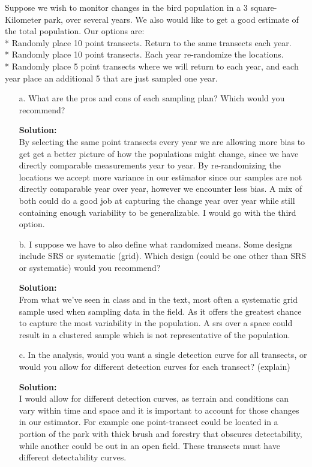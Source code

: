 \documentclass[12pt]{article}
\makeatletter
\theoremstyle{homework}
\newenvironment{exercise}[1]
{\def\@currentlabel{#1}\exercisecore}
{\endexercisecore}
\newcommand{\localhead}[1]{\par\smallskip\noindent\textbf{#1}\nobreak\\}%
\newcommand\solution{\localhead{Solution:}}
\makeatother
\begin{document}
\begin{exercise}{6} Suppose we wish to monitor changes in the bird population in a 3 square-Kilometer park, over several years. 
  We also would like to get a good estimate of the total population. Our options are:\\
  * Randomly place 10 point transects. Return to the same transects each year.\\
  * Randomly place 10 point transects. Each year re-randomize the locations.\\
  * Randomly place 5 point transects where we will return to each year, and each year place an additional 5 that are just sampled one year.\\
  \begin{enumerate}
    \item[a.] What are the pros and cons of each sampling plan? Which would you recommend?\\
    \solution By selecting the same point transects every year we are allowing more bias to get get a better picture of how the populations might change, since we 
    have directly comparable measurements year to year. By re-randomizing the locations we accept more variance in our estimator since our samples are not directly comparable year over year, 
    however we encounter less bias. A mix of both could do a good job at capturing the change year over year while still containing enough variability to be generalizable. I would go with 
    the third option.
    \vspace{.15in}
    
    \item[b.] I suppose we have to also define what randomized means. Some designs include SRS or systematic (grid). 
    Which design (could be one other than SRS or systematic) would you recommend?\\
    \solution From what we've seen in class and in the text, most often a systematic grid sample used when sampling data in the field. As it offers the greatest
    chance to capture the most variability in the population. A srs over a space could result in a clustered sample which is not representative of the population. 
    \vspace{.15in}
    

    \item[c.] In the analysis, would you want a single detection curve for all transects, or would you allow for different detection curves for each transect? (explain)\\
    \solution I would allow for different detection curves, as terrain and conditions can vary within time and space and it is important to account for those changes in our estimator. 
    For example one point-transect could be located in a portion of the park with thick brush and forestry that obscures detectability, while another could be out in an open field. These
    transects must have different detectability curves. 
  \end{enumerate}
\end{exercise}
\vspace{1in}
\end{document}
